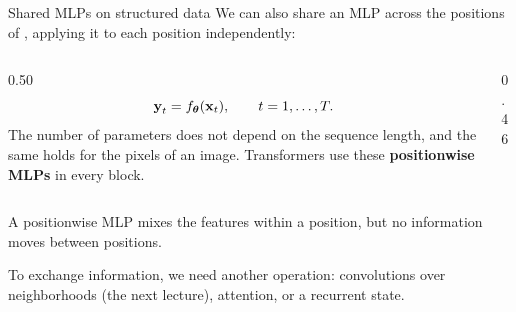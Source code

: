 \ifdefined\MLPPositionwiseInCNNDeck\else
\begin{frame}{Shared MLPs on structured data}
	\small
	\setlength{\abovedisplayskip}{4pt}\setlength{\belowdisplayskip}{4pt}
	We can also share an MLP across the positions of \MLPSequenceDescription{},
	applying it to each position independently:

	\medskip
	\begin{columns}[c,onlytextwidth]
		\begin{column}{0.50\textwidth}
			\[
				\boldsymbol{\mathbf{y}}_t=f_{\boldsymbol{\theta}}(\boldsymbol{\mathbf{x}}_t),\qquad t=1,\ldots,T.{}
			\]
			The number of parameters does not depend on the sequence length,
			and the same holds for the pixels of an image.
			Transformers use these \textbf{positionwise MLPs} in every block.
		\end{column}
		\begin{column}{0.46\textwidth}
			\centering
			\MLPPositionDiagram{}
		\end{column}
	\end{columns}

	\medskip
	\begin{tcolorbox}[nndsorange,boxsep=1mm,top=1mm,bottom=1mm,fontupper=\small]
		A positionwise MLP mixes the features within a position, but no information moves between positions.
	\end{tcolorbox}

	To exchange information, we need another operation: convolutions over
	neighborhoods (the next lecture), attention, or a recurrent state.
\end{frame}
\fi
